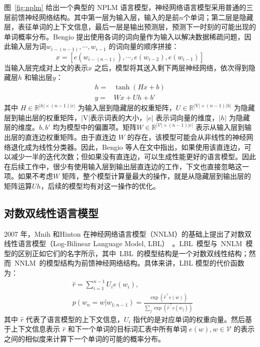图~\ref{fig:nplm} 给出一个典型的 NPLM 语言模型，神经网络语言模型采用普通的三层前馈神经网络结构。其中第一层为输入层，输入的是前$n$个单词；第二层是隐藏层，表征单词的上下文信息，最后一层是输出预测层，预测下一时刻的可能出现的单词概率分布。Bengio 提出使用各词的词向量作为输入以解决数据稀疏问题，因此输入层为词$w_{i-(n-1)}, \cdots,w_{i-1} $ 的词向量的顺序拼接：
\begin{equation}\label{equ:we}
  x = [e(w_{i-(n-1)}), \cdots , e(w_{i-2}), e{(w_{i-1})}]
\end{equation}
当输入层完成对上文的表示$x$ 之后，模型将其送入剩下两层神经网络，依次得到隐藏层$h$ 和输出层$y$：
\begin{equation}\label{equ:nplm}
\begin{split}
h =& \tanh(Hx+b) \\
y =&Wx + Uh +b'
\end{split}
\end{equation}
其中 $H \in \mathbb{R}^{|h| \times (n-1)|e|}$ 为输入层到隐藏层的权重矩阵，$U \in \mathbb{R}^{|\mathrm{V}|\times (n-1)|h|}$ 为隐藏层到输出层的权重矩阵，$ |\mathrm{V}|$表示词表的大小，$|e|$ 表示词向量的维度，$|h|$ 为隐藏层的维度。$b,b'$ 均为模型中的偏置项。矩阵$W \in \mathbb{R}^{|\mathcal{V}|\times (n-1)|e|}$ 表示从输入层到输出层的直连边权重矩阵。由于直连边 $W$ 的存在，该模型可能会从非线性的神经网络退化成为线性分类器。因此，Bengio 等人在文中指出，如果使用该直连边，可以减少一半的迭代次数；但如果没有直连边，可以生成性能更好的语言模型。因此在后续工作中，很少有使用输入层到输出层直连边的工作，下文也直接忽略这一项。如果不考虑$W$ 矩阵，整个模型计算量最大的操作，就是从隐藏层到输出层的矩阵运算$Uh$，后续的模型均有对这一操作的优化。

\subsection{对数双线性语言模型}
2007 年，Mnih 和Hinton 在神经网络语言模型（NNLM）的基础上提出了对数双线性语言模型（Log-Bilinear Language Model, LBL）~。LBL~模型与~NNLM~模型的区别正如它们的名字所示，其中~LBL~的模型结构是一个对数双线性结构；然而~NNLM~的模型结构为前馈神经网络结构。具体来讲，LBL 模型的代价函数为：
\begin{equation}
\label{equ:lbl}
\begin{split}
   &\hat r=\sum_{i=1}^{n-1}{U_i e({w_i})}, \\
   &p(w_n=w|w_{1:n-1})=\frac{\exp(\hat r^\top e(w))}{\sum_j{\exp(\hat r^\top e(w_j))}}
\end{split}
\end{equation}
其中 $\hat r$ 代表了语言模型的上下文信息，$U_i$ 指代的是对应单词的权重向量。然后基于上下文信息表示 $\hat r$ 和下一个单词的目标词汇表中所有单词 $e(w),w\in \mathcal{V}$ 的表示之间的相似度来计算下一个单词的可能的概率分布。

